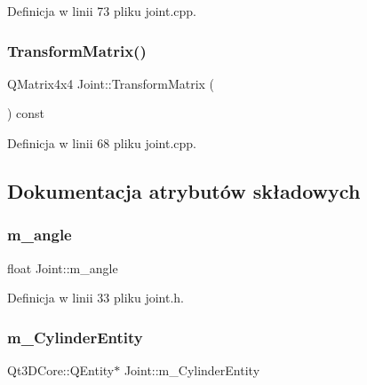 Definicja w linii 73 pliku joint.\+cpp.

\mbox{\label{class_joint_a0bf632e9b7a8de79429be16f963e81f7}} 
\subsubsection{\texorpdfstring{Transform\+Matrix()}{TransformMatrix()}}
{\footnotesize\ttfamily Q\+Matrix4x4 Joint\+::\+Transform\+Matrix (\begin{DoxyParamCaption}{ }\end{DoxyParamCaption}) const}



Definicja w linii 68 pliku joint.\+cpp.



\subsection{Dokumentacja atrybutów składowych}
\mbox{\label{class_joint_a293274b0f6de50fb79f532f64af9a048}} 
\subsubsection{\texorpdfstring{m\+\_\+angle}{m\_angle}}
{\footnotesize\ttfamily float Joint\+::m\+\_\+angle\hspace{0.3cm}{\ttfamily [protected]}}



Definicja w linii 33 pliku joint.\+h.

\mbox{\label{class_joint_a0862c4b658d00415ae4952e43af4931b}} 
\subsubsection{\texorpdfstring{m\+\_\+\+Cylinder\+Entity}{m\_CylinderEntity}}
{\footnotesize\ttfamily Qt3\+D\+Core\+::\+Q\+Entity$\ast$ Joint\+::m\+\_\+\+Cylinder\+Entity\hspace{0.3cm}{\ttfamily [protected]}}




